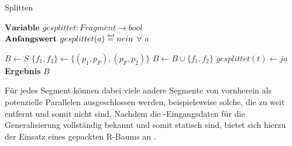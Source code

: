 \documentclass[../main/thesis.tex]{subfiles}
\begin{document}
\begin{algorithm}[H]
\caption{Splitten}\label{alg:Splitten}
$\textbf{Variable } gesplittet : Fragment \rightarrow bool$
\\$\textbf{Anfangswert } gesplittet(a) \stackrel{\text{\tiny def}}{=} nein$ $\forall$ $a$
\begin{algorithmic}
	\State $B \gets S$
				\State $\{f_1, f_2\} \gets \{(p_1, p_F), (p_F, p_2)\}$
				\State $B \gets B \cup \{f_1, f_2\}$
				\State $gesplittet(t) \gets ja$
			\EndFor
		\EndFor
	\EndFor
	\State \textbf{Ergebnis} $B$
\EndFunction
\end{algorithmic}
\end{algorithm}


Für jedes Segment können dabei viele andere Segmente von vornherein als potenzielle Parallelen ausgeschlossen werden, beispielsweise solche, die zu weit entfernt und somit nicht  sind.
Nachdem die \osm-Eingangsdaten für die Generalisierung vollständig bekannt und somit statisch sind, bietet sich hierzu der Einsatz eines gepackten R-Baums an .


\end{document}
